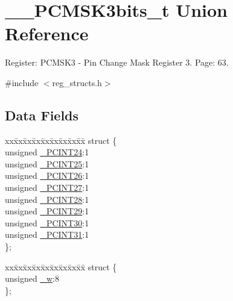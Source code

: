 \hypertarget{union_____p_c_m_s_k3bits__t}{\section{\+\_\+\+\_\+\+P\+C\+M\+S\+K3bits\+\_\+t Union Reference}
\label{union_____p_c_m_s_k3bits__t}
}


Register\+: P\+C\+M\+S\+K3 -\/ Pin Change Mask Register 3. Page\+: 63.  




{\ttfamily \#include $<$reg\+\_\+structs.\+h$>$}

\subsection*{Data Fields}
\begin{DoxyCompactItemize}
\item 
\begin{tabbing}
xx\=xx\=xx\=xx\=xx\=xx\=xx\=xx\=xx\=\kill
struct \{\\
\>unsigned \hyperlink{union_____p_c_m_s_k3bits__t_a78b80e558d274bdd09a4bf9a77fafdbd}{\_PCINT24}:1\\
\>unsigned \hyperlink{union_____p_c_m_s_k3bits__t_af856e689d838444c14a437917852de49}{\_PCINT25}:1\\
\>unsigned \hyperlink{union_____p_c_m_s_k3bits__t_a798486e5466f184399b2991dc14dd300}{\_PCINT26}:1\\
\>unsigned \hyperlink{union_____p_c_m_s_k3bits__t_a53a5bfa63892b4e8906aaa2eeaa3fd88}{\_PCINT27}:1\\
\>unsigned \hyperlink{union_____p_c_m_s_k3bits__t_aa9e168d399723ffc0a69ee857f4fc4d0}{\_PCINT28}:1\\
\>unsigned \hyperlink{union_____p_c_m_s_k3bits__t_a71a34315734b61d8b5c1a5840a09bff8}{\_PCINT29}:1\\
\>unsigned \hyperlink{union_____p_c_m_s_k3bits__t_ab0f59eb8b923e669796cdddd9f7aa208}{\_PCINT30}:1\\
\>unsigned \hyperlink{union_____p_c_m_s_k3bits__t_ae72615601aeba43313c29c13b6e00fb6}{\_PCINT31}:1\\
\}; \\

\end{tabbing}\item 
\begin{tabbing}
xx\=xx\=xx\=xx\=xx\=xx\=xx\=xx\=xx\=\kill
struct \{\\
\>unsigned \hyperlink{union_____p_c_m_s_k3bits__t_ac0000dfc6a94e14008689e5e52e75d1a}{\_w}:8\\
\}; \\

\end{tabbing}\end{DoxyCompactItemize}


